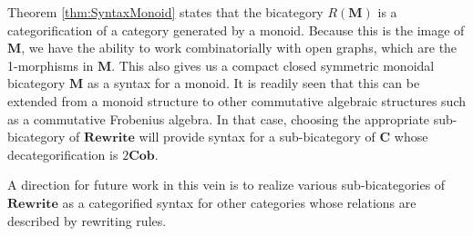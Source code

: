 \documentclass[11pt]{amsart}
\newcommand{\cat}[1]{\mathbf{#1}}
\theoremstyle{remark}
\theoremstyle{definition}
\begin{document}
Theorem \ref{thm:SyntaxMonoid} states 
that the bicategory 
	$ R ( \cat{ M } ) $ 
is a categorification of a 
category generated by a monoid.  
Because this is the image of 
	$ \cat{ M } $, 
we have the ability to work 
combinatorially with open graphs, 
which are the 1-morphisms in $\cat{M}$.  
This also gives us a 
compact closed symmetric monoidal bicategory 
$ \cat{ M } $ as a syntax for a monoid.  
It is readily seen that this can be 
extended from a monoid structure 
to other commutative algebraic structures 
such as a commutative Frobenius algebra. 
In that case, choosing the 
appropriate sub-bicategory of $ \cat{ Rewrite } $ 
will provide syntax for a sub-bicategory of
	$ \cat{ C } $ 	
whose decategorification is $ 2 \cat{ Cob } $. 

A direction for future work in this vein
is to realize various sub-bicategories 
of $\cat{ Rewrite }$ as a categorified 
syntax for other categories whose 
relations are described by rewriting rules.



%
%
\end{document}
